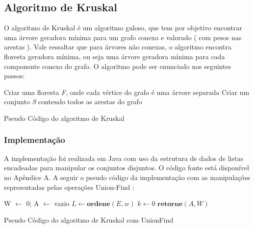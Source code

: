 \documentclass[a4paper,12pt]{article}
\begin{document}
\subsection{Algoritmo de Kruskal}
O algoritmo de Kruskal é um algoritmo guloso, que tem por objetivo encontrar uma árvore geradora mínima para um grafo conexo e valorado ( com pesos nas arestas ). Vale ressaltar que para árvores não conexas, o algoritmo encontra floresta geradora mínima, ou seja uma árvore geradora mínima para cada componente conexo do grafo. O algoritmo pode ser enunciado nos seguintes passos:

\begin{algorithm}[H]
\SetAlgoLined
{}
Criar uma floresta \emph{F}, onde cada vértice do grafo é uma árvore separada\;
Criar um conjunto \emph{S} contendo todos as arestas do grafo\;
\caption{Pseudo Código do algoritmo de Kruskal}
\end{algorithm}

\subsubsection{Implementação}
A implementação foi realizada em Java com uso da estrutura de dados de listas encadeadas para manipular os conjuntos disjuntos. O código fonte está disponível no Apêndice A. A seguir o pseudo código da implementação com as manipulações representadas pelas operações Union-Find :\\
\begin{algorithm}[H]
\LinesNumbered
\SetAlgoLined
{}
W $\gets$ 0; A $\gets$ vazio\;
$L \gets \textbf{ordene}(E ,w )$\;
$k \gets 0$\;
$\textbf{retorne} (A, W)$\;
\caption{Pseudo Código do algoritmo de Kruskal com UnionFind}
\label{kruskal}
\end{algorithm}
\end{document}
